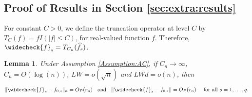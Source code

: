 \documentclass[11pt, preprint]{imsart}
\numberwithin{equation}{section}
\theoremstyle{plain}
\newtheorem{lemma}{\indent Lemma}
\theoremstyle{definition}
\begin{document}
\subsection{Proof of Results in Section \ref{sec:extra:results}}\label{sec:proof:sec:5}
 For constant $C>0$, we define the truncation operator at level $C$ by $T_C(f)=fI(|f|\leq C)$, for real-valued function $f$. Therefore, $\widecheck{f}_s=T_{C_n}(\widehat{f}_s)$.
\begin{lemma}\label{lemma:convergence:truncated:DNN}
Under Assumption \ref{Assumption:AC}, if $C_n \to \infty$, $C_n=O(\log(n))$, $LW=o(\sqrt{n})$ and $LWd=o(n)$, then
\begin{eqnarray}
	\|\widecheck{f}_s-f_{0,s}\|_n=O_P(r_n)\;\;\textrm{ and }\;\; \|\widecheck{f}_s-f_{0,s}\|=O_P(r_n)\quad \textrm{ for all } s=1,\ldots, q.\nonumber
\end{eqnarray}
\end{lemma}
\end{document}
